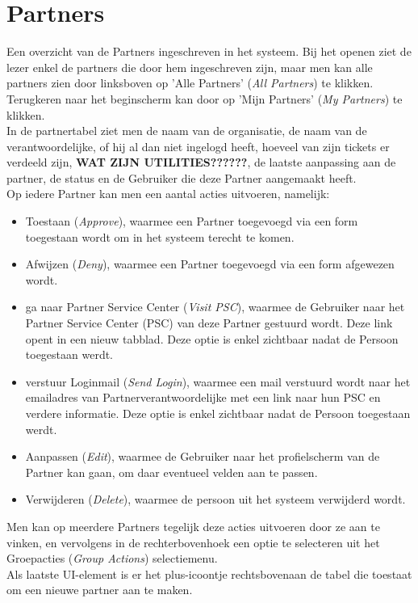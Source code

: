 \documentclass[]{memoir}
\begin{document}
\section{Partners}
Een overzicht van de Partners ingeschreven in het systeem. Bij het openen ziet de lezer enkel de partners die door hem ingeschreven zijn, maar men kan alle partners zien door linksboven op 'Alle Partners' (\textsl{All Partners}) te klikken. Terugkeren naar het beginscherm kan door op 'Mijn Partners' (\textsl{My Partners}) te klikken.\\
In de partnertabel ziet men de naam van de organisatie, de naam van de verantwoordelijke, of hij al dan niet ingelogd heeft, hoeveel van zijn tickets er verdeeld zijn, \textbf{WAT ZIJN UTILITIES??????}, de laatste aanpassing aan de partner, de status en de Gebruiker die deze Partner aangemaakt heeft.\\
Op iedere Partner kan men een aantal acties uitvoeren, namelijk:
\begin{itemize}
	\item Toestaan (\textsl{Approve}), waarmee een Partner toegevoegd via een form  toegestaan wordt om in het systeem terecht te komen.
	\item Afwijzen  (\textsl{Deny}), waarmee een Partner toegevoegd via een form  afgewezen wordt.
	\item ga naar Partner Service Center  (\textsl{Visit PSC}), waarmee de Gebruiker naar het Partner Service Center (PSC) van deze Partner gestuurd wordt. Deze link opent in een nieuw tabblad. Deze optie is enkel zichtbaar nadat de Persoon toegestaan werdt.
	\item verstuur Loginmail  (\textsl{Send Login}), waarmee een mail verstuurd wordt naar het emailadres van Partnerverantwoordelijke met een link naar hun PSC en verdere informatie. Deze optie is enkel zichtbaar nadat de Persoon toegestaan werdt.
	\item Aanpassen (\textsl{Edit}), waarmee de Gebruiker naar het profielscherm van de Partner kan gaan, om daar eventueel velden aan te passen.
	\item Verwijderen (\textsl{Delete}), waarmee de persoon uit het systeem verwijderd wordt.
\end{itemize}
Men kan op meerdere Partners tegelijk deze acties uitvoeren door ze aan te vinken, en vervolgens in de rechterbovenhoek een optie te selecteren uit het Groepacties  (\textsl{Group Actions}) selectiemenu.\\
Als laatste UI-element is er het plus-icoontje rechtsbovenaan de tabel die toestaat om een nieuwe partner aan te maken.
\end{document}
